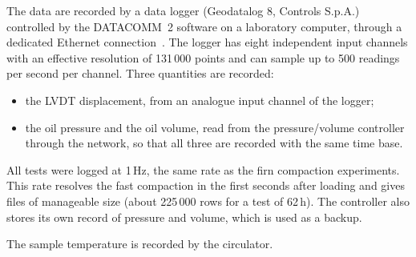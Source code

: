 The data are recorded by a data logger (Geodatalog 8, Controls S.p.A.) controlled by the DATACOMM~2 software on a laboratory computer, through a dedicated Ethernet connection~\cite{geodatalog2020}. The logger has eight independent input channels with an effective resolution of 131\,000 points and can sample up to 500 readings per second per channel. Three quantities are recorded:
\begin{itemize}
    \item the LVDT displacement, from an analogue input channel of the logger;
    \item the oil pressure and the oil volume, read from the pressure/volume controller through the network, so that all three are recorded with the same time base.
\end{itemize}
All tests were logged at 1\,Hz, the same rate as the firn compaction experiments. This rate resolves the fast compaction in the first seconds after loading and gives files of manageable size (about 225\,000 rows for a test of 62\,h). The controller also stores its own record of pressure and volume, which is used as a backup.

The sample temperature is recorded by the circulator.
